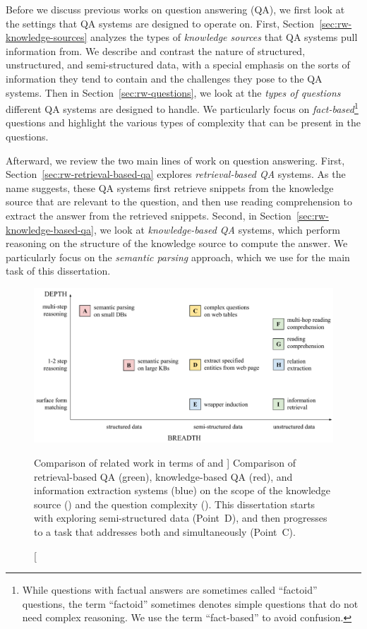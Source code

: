 Before
we discuss previous works on question answering (QA),
we first look at the settings that QA systems
are designed to operate on.
First, Section~\ref{sec:rw-knowledge-sources}
analyzes the types of \emph{knowledge sources} that QA
systems pull information from.
We describe and contrast the nature of
structured, unstructured, and semi-structured data,
with a special emphasis on the sorts of information they tend to contain
and the challenges they pose to the QA systems.
Then in Section~\ref{sec:rw-questions},
we look at the \emph{types of questions} different QA systems
are designed to handle.
We particularly focus on \emph{fact-based}\footnote{While
questions with factual answers
are sometimes called ``factoid'' questions,
the term ``factoid'' sometimes denotes simple questions
that do not need complex reasoning.
We use the term ``fact-based'' to avoid confusion.}
questions and highlight the various types of complexity
that can be present in the questions.

Afterward, we review the two main lines of work on question answering.
First, Section~\ref{sec:rw-retrieval-based-qa}
explores \emph{retrieval-based QA} systems.
As the name suggests,
these QA systems
first retrieve snippets from the knowledge source
that are relevant to the question,
and then use reading comprehension to extract the answer
from the retrieved snippets.
Second, in Section~\ref{sec:rw-knowledge-based-qa},
we look at \emph{knowledge-based QA} systems,
which perform
reasoning on the structure of the knowledge source
to compute the answer.
We particularly focus on the \emph{semantic parsing} approach,
which we use for the main task of this dissertation.

\begin{figure}[t]
\centering
\includegraphics[width=\textwidth]{figures/intro/breadth-depth.pdf}
\caption
[Comparison of related work in terms of \Breadth and \Depth]
{Comparison of retrieval-based QA (green),
knowledge-based QA (red),
and information extraction systems (blue) on
the scope of the knowledge source (\Breadth)
and the question complexity (\Depth).
This dissertation starts
with exploring semi-structured data
(Point~D),
and then progresses to a task that addresses
both \Breadth and \Depth
simultaneously (Point~C).}
\label{fig:depth-breadth-plot}
\end{figure}

